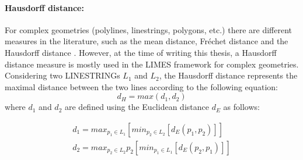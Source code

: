\begin{figure}[ht!b]
\end{figure}

\paragraph{Hausdorff distance:}
For complex geometries (polylines, linestrings, polygons, etc.) there are different measures in the literature, such as the mean distance, Fr\'echet distance and the Hausdorff distance \cite{anamaria08}. However, at the time of writing this thesis, a Hausdorff distance measure is mostly used in the LIMES framework for complex geometries. Considering two LINESTRINGs $L_{1}$ and $L_{2}$, the Hausdorff distance represents the maximal distance between the two lines according to the following equation:
\begin{equation}
d_{H} = max(d_{1}, d_{2} )
\end{equation}
where $d_{1}$ and $d_{2}$ are defined using the Euclidean distance $d_{E}$ as follows:

\begin{align}
d_{1} = max_{p_{1} \in L_{1}}[min_{p_{2} \in L_{2}}[d_{E}(p_{1}, p_{2})]] \\
d_{2} = max_{p_{2} \in L_{2}}{p_{2}}[min_{p_{1} \in L_{1}}[d_{E}(p_{2}, p_{1})]]
\end{align}

